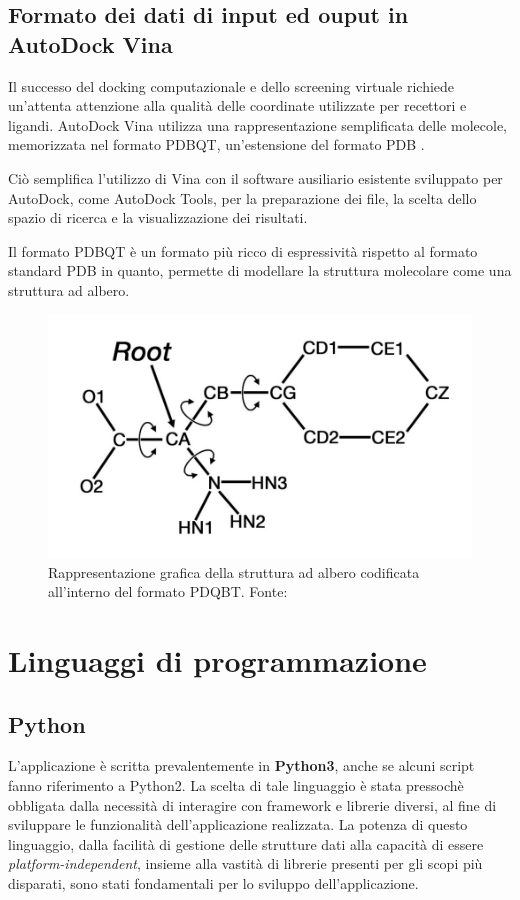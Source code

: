 \subsection{Formato dei dati di input ed ouput in AutoDock Vina}
Il successo del docking computazionale e dello screening virtuale richiede un'attenta attenzione alla qualità delle coordinate utilizzate per recettori e ligandi. AutoDock Vina utilizza una rappresentazione semplificata delle molecole, memorizzata nel formato PDBQT, un'estensione del formato PDB \cite{forli_computational_2016}.

Ciò semplifica l'utilizzo di Vina con il software ausiliario esistente sviluppato per AutoDock, come AutoDock Tools, per la preparazione dei file, la scelta dello spazio di ricerca e la visualizzazione dei risultati. \cite{trott_autodock_2009}

Il formato PDBQT è un formato più ricco di espressività rispetto al formato standard PDB in quanto, permette di modellare la struttura molecolare come una struttura ad albero.

\begin{figure}[H]
    \centering
    \includegraphics[scale=0.5]{images/chapter2/pdbqt.jpg}
    \caption[Rappresentazione grafica del formato PDQBT.]{Rappresentazione grafica della struttura ad albero codificata all'interno del formato PDQBT. Fonte: \cite{eberhardt_autodock_nodate}}
    \label{fig:pdbqt}
\end{figure}

\section{Linguaggi di programmazione}
\subsection{Python}
L'applicazione è scritta prevalentemente in \textbf{Python3}, anche se alcuni script fanno riferimento a Python2. La scelta di tale linguaggio è stata pressochè obbligata dalla necessità di interagire con framework e librerie diversi, al fine di sviluppare le funzionalità dell'applicazione realizzata.
La potenza di questo linguaggio, dalla facilità di gestione delle strutture dati alla capacità di essere \textit{platform-independent}, insieme alla vastità di librerie presenti per gli scopi più disparati, sono stati fondamentali per lo sviluppo dell'applicazione.


